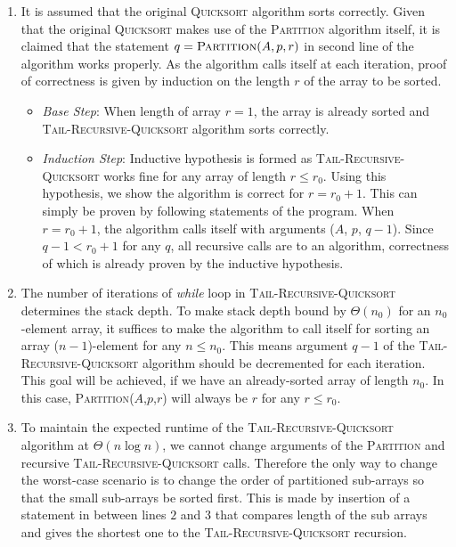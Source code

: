 \begin{enumerate}[label=(\alph*)]
\item It is assumed that the original \textsc{Quicksort} algorithm sorts correctly. Given that the original \textsc{Quicksort} makes use of the \textsc{Partition} algorithm itself, it is claimed that the statement $q = \textsc{Partition}(A,p,r)$ in second line of the algorithm works properly. As the algorithm calls itself at each iteration, proof of correctness is given by induction on the length $r$ of the array to be sorted.

\begin{itemize}
\item[] \emph{Base Step}: When length of array $r = 1$, the array is already sorted and \textsc{Tail-Recursive-Quicksort} algorithm sorts correctly.
\item[] \emph{Induction Step}: Inductive hypothesis is formed as \textsc{Tail-Recursive-Quicksort} works fine for any array of length $r \leq r_0$. Using this hypothesis, we show the algorithm is correct for $r = r_0 + 1$. This can simply be proven by following statements of the program. When $r = r_0 + 1$, the algorithm calls itself with arguments ($A$, $p$, $q-1$). Since $q - 1 < r_0+1$ for any $q$, all recursive calls are to an algorithm, correctness of which is already proven by the inductive hypothesis.
\end{itemize}

\item The number of iterations of \textit{while} loop in \textsc{Tail-Recursive-Quicksort} determines the stack depth. To make stack depth bound by $\Theta(n_0)$ for an $n_0$-element array, it suffices to make the algorithm to call itself for sorting an array ($n-1$)-element for any $n \leq n_0$. This means argument $q-1$ of the \textsc{Tail-Recursive-Quicksort} algorithm should be decremented for each iteration. This goal will be achieved, if we have an already-sorted array of length $n_0$. In this case, \textsc{Partition}($A$,$p$,$r$) will always be $r$ for any $r \leq r_0$.

\item To maintain the expected runtime of the \textsc{Tail-Recursive-Quicksort} algorithm at $\Theta(n \log n)$, we cannot change arguments of the \textsc{Partition} and recursive \textsc{Tail-Recursive-Quicksort} calls. Therefore the only way to change the worst-case scenario is to change the order of partitioned sub-arrays so that the small sub-arrays be sorted first. This is made by insertion of a statement in between lines $2$ and $3$ that compares length of the sub arrays and gives the shortest one to the \textsc{Tail-Recursive-Quicksort} recursion.

\end{enumerate}
